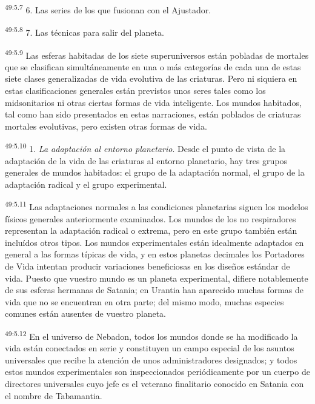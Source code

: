 \par
\textsuperscript{49:5.7} 6. Las series de los que fusionan con el Ajustador.

\par
\textsuperscript{49:5.8} 7. Las técnicas para salir del planeta.

\par
\textsuperscript{49:5.9} Las esferas habitadas de los siete superuniversos están pobladas de mortales que se clasifican simultáneamente en una o más categorías de cada una de estas siete clases generalizadas de vida evolutiva de las criaturas. Pero ni siquiera en estas clasificaciones generales están previstos unos seres tales como los midsonitarios ni otras ciertas formas de vida inteligente. Los mundos habitados, tal como han sido presentados en estas narraciones, están poblados de criaturas mortales evolutivas, pero existen otras formas de vida.

\par
\textsuperscript{49:5.10} 1. \textit{La adaptación al entorno planetario}. Desde el punto de vista de la adaptación de la vida de las criaturas al entorno planetario, hay tres grupos generales de mundos habitados: el grupo de la adaptación normal, el grupo de la adaptación radical y el grupo experimental.

\par
\textsuperscript{49:5.11} Las adaptaciones normales a las condiciones planetarias siguen los modelos físicos generales anteriormente examinados. Los mundos de los no respiradores representan la adaptación radical o extrema, pero en este grupo también están incluídos otros tipos. Los mundos experimentales están idealmente adaptados en general a las formas típicas de vida, y en estos planetas decimales los Portadores de Vida intentan producir variaciones beneficiosas en los diseños estándar de vida. Puesto que vuestro mundo es un planeta experimental, difiere notablemente de sus esferas hermanas de Satania; en Urantia han aparecido muchas formas de vida que no se encuentran en otra parte; del mismo modo, muchas especies comunes están ausentes de vuestro planeta.

\par
\textsuperscript{49:5.12} En el universo de Nebadon, todos los mundos donde se ha modificado la vida están conectados en serie y constituyen un campo especial de los asuntos universales que recibe la atención de unos administradores designados; y todos estos mundos experimentales son inspeccionados periódicamente por un cuerpo de directores universales cuyo jefe es el veterano finalitario conocido en Satania con el nombre de Tabamantia.


